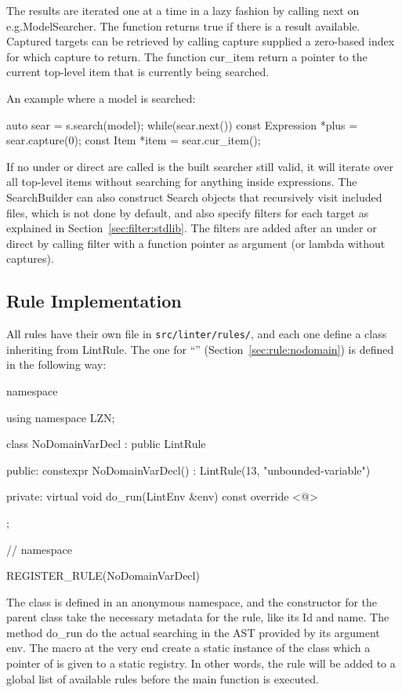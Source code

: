 \documentclass[a4paper,12pt]{article}
\newcommand{\cpp}[1]{\mbox{\mznfont #1}}
\newcommand{\ruleref}[1]{``\nameref{sec:rule:#1}'' (Section~\ref{sec:rule:#1})}
\begin{document}
The results are iterated one at a time in a lazy fashion by calling \cpp{next} on e.g.\@ \cpp{ModelSearcher}.
The function returns true if there is a result available. Captured targets can be
retrieved by calling \cpp{capture} supplied a zero-based index for which capture to return.
The function \cpp{cur\_item} return a pointer to the current top-level item that is currently
being searched.

An example where a model is searched:
\begin{cppp}[style=nonumbers]
auto sear = s.search(model);
while(sear.next()) {
  const Expression *plus = sear.capture(0);
  const Item *item = sear.cur_item();
}
\end{cppp}

If no \cpp{under} or \cpp{direct} are called is the built searcher still valid, it will
iterate over all top-level items without searching for anything inside expressions.
The \cpp{SearchBuilder} can also construct \cpp{Search} objects that recursively visit
included files, which is not done by default, and also specify filters for each target as
explained in Section~\ref{sec:filter:stdlib}. The filters are added after an \cpp{under}
or \cpp{direct} by calling \cpp{filter} with a function pointer as argument (or lambda
without captures).

\fussy %
\subsection{Rule Implementation}\label{sec:impl:rules}
All rules have their own file in \texttt{src/linter/rules/}, and each one define a class
inheriting from \cpp{LintRule}. The one for \ruleref{nodomain} is defined in the following way:
\begin{cppp}
namespace {
using namespace LZN;

class NoDomainVarDecl : public LintRule {
public:
  constexpr NoDomainVarDecl() : LintRule(13, "unbounded-variable") {}

private:
  virtual void do_run(LintEnv &env) const override {<@\dots@>}
};

} // namespace

REGISTER_RULE(NoDomainVarDecl)
\end{cppp}
The class is defined in an anonymous namespace, and the constructor for the parent class take
the necessary metadata for the rule, like its Id and name. The method \cpp{do\_run} do the
actual searching in the AST provided by its argument \cpp{env}. The macro at the very end
create a static instance of the class which a pointer of is given to a static registry.
In other words, the rule will be added to a global list of available rules before the main
function is executed.
\end{document}
